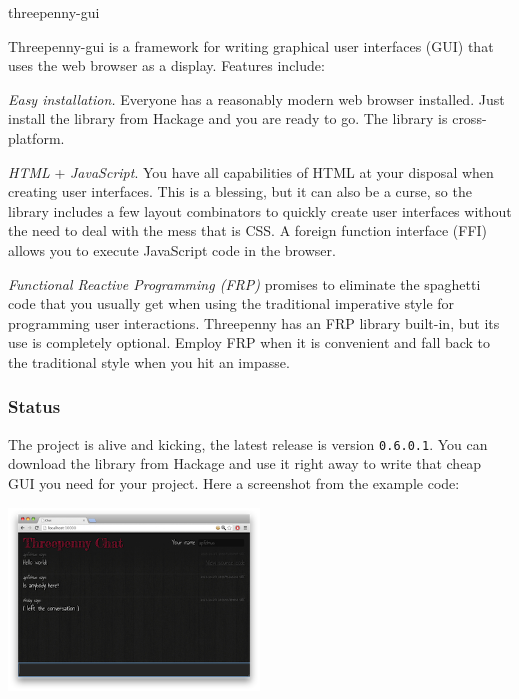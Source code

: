 \begin{hcarentry}[updated]{threepenny-gui}
\label{threepenny-gui}
\makeheader

Threepenny-gui is a framework for writing graphical user interfaces (GUI) that uses the web browser as a display. Features include:

\begin{compactitem}
\item \emph{Easy installation.} Everyone has a reasonably modern web browser installed. Just install the library from Hackage and you are ready to go. The library is cross-platform.
\item \emph{HTML} + \emph{JavaScript}. You have all capabilities of HTML at your disposal when creating user interfaces. This is a blessing, but it can also be a curse, so the library includes a few layout combinators to quickly create user interfaces without the need to deal with the mess that is CSS. A foreign function interface (FFI) allows you to execute JavaScript code in the browser.
\item \emph{Functional Reactive Programming (FRP)} promises to eliminate the spaghetti code that you usually get when using the traditional imperative style for programming user interactions. Threepenny has an FRP library built-in, but its use is completely optional. Employ FRP when it is convenient and fall back to the traditional style when you hit an impasse.
\end{compactitem}

\subsubsection*{Status}

The project is alive and kicking, the latest release is version \verb`0.6.0.1`. You can download the library from Hackage and use it right away to write that cheap GUI you need for your project. Here a screenshot from the example code:

\begin{center}
\includegraphics[width=0.5\textwidth]{html/chat.jpg}
\end{center}


\end{hcarentry}
